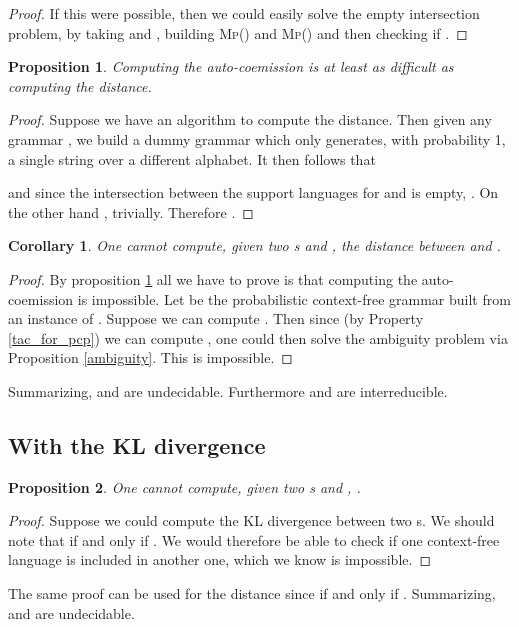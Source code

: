 \documentclass[submission]{eptcs} \usepackage{breakurl}             \usepackage[english]{babel}
\newtheorem{proposition}{Proposition}
\newtheorem{corollary}{Corollary}
\begin{document}
\begin{proof} If this were possible, then we could easily solve the empty intersection problem, by taking  and , building  \textsc{Mp}() and \textsc{Mp}() and then checking if .
\end{proof}
\begin{proposition}\label{coemd2reduction}
Computing the auto-coemission  is at least as difficult as computing the  distance.
\end{proposition}
\begin{proof}
Suppose we have an algorithm to compute the  distance. Then given any grammar , we build a dummy grammar  which only generates, with probability 1, a single string over a different alphabet. It then follows that

and since the intersection between the support languages for  and  is empty, . On the other hand , trivially.
Therefore .
\end{proof}

\begin{corollary}
One cannot compute, given two s  and , the  distance between  and .
\end{corollary}
\begin{proof}
By proposition \ref{coemd2reduction} all we have to prove is that computing the auto-coemission is impossible.
Let  be the probabilistic context-free grammar built from an instance of . Suppose we can compute . Then since (by Property \ref{tac_for_pcp}) we can compute , one could then solve the ambiguity problem via Proposition \ref{ambiguity}. This is impossible.
\end{proof}
Summarizing,  and  are undecidable. Furthermore  and  are interreducible.


\subsection{With the KL divergence}
\begin{proposition}
One cannot compute, given two s  and , .
\end{proposition}
\begin{proof}
Suppose we could compute the KL divergence between two s. We should note that  if and only if . We would therefore be able to check if one context-free language is included in another one, which we know is impossible.
\end{proof}
The same proof can be used for the  distance since  if and only if . Summarizing,  and  are undecidable.
\end{document}
